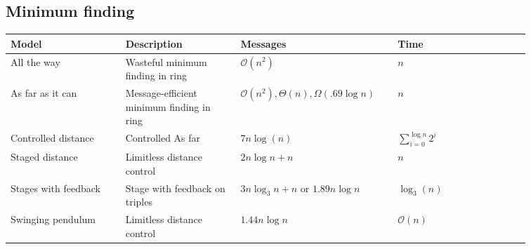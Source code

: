\subsection{Minimum finding}
\begin{table}[h]
\begin{tabular}{p{0.2\linewidth} p{0.2\linewidth} p{0.23\linewidth} p{0.23\linewidth}}
			\textbf{Model}		& \textbf{Description}						& \textbf{Messages}						& \textbf{Time} \\
	\hline 	All the way			& Wasteful minimum finding in ring			& $\mathcal{O}(n^2)$					 & $n$ \\
	\hline 	As far as it can	& Message-efficient minimum finding in ring	& $\mathcal{O}(n^2), \Theta(n), \Omega(.69\log{n})$
																													& $n$ \\
	\hline 	Controlled distance	& Controlled As far							& $7n \log(n)$							& $\sum_{i=0}^{\log{n}}2^i$ \\
	\hline 	Staged distance		& Limitless distance control				& $2n\log{n} + n$						& $n$ \\
	\hline 	Stages with feedback& Stage with feedback on triples			& $3n\log_3{n} + n$ or $1.89n\log{n}$	& $\log_3(n)$ \\
	\hline 	Swinging pendulum	& Limitless distance control				& $1.44n\log{n}$						& $\mathcal{O}(n)$ \\
\end{tabular}
\end{table}